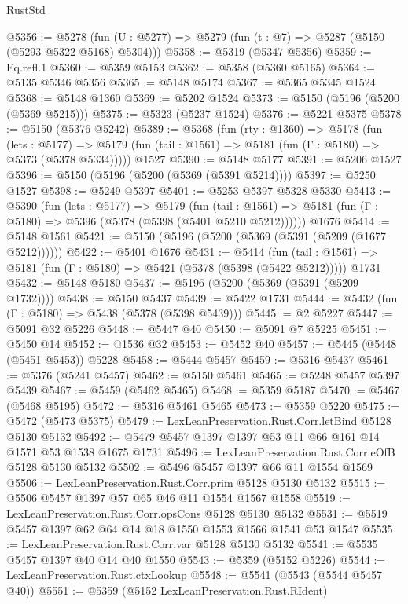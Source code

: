 \begin{lexlean}{RustStd}
\begin{coremodule}
@5356 := @5278 (fun (U : @5277) => @5279 (fun (t : @7) => @5287 (@5150 (@5293 @5322 @5168) @5304)))
@5358 := @5319 (@5347 @5356)
@5359 := Eq.refl.{1}
@5360 := @5359 @5153
@5362 := @5358 (@5360 @5165)
@5364 := @5135 @5346 @5356
@5365 := @5148 @5174
@5367 := @5365 @5345 @1524
@5368 := @5148 @1360
@5369 := @5202 @1524
@5373 := @5150 (@5196 (@5200 (@5369 @5215)))
@5375 := @5323 (@5237 @1524)
@5376 := @5221 @5375
@5378 := @5150 (@5376 @5242)
@5389 := @5368
    (fun (rty : @1360) =>
    @5178
      (fun (lets : @5177) =>
      @5179 (fun (tail : @1561) => @5181 (fun (Γ : @5180) => @5373 (@5378 @5334)))))
    @1527
@5390 := @5148 @5177
@5391 := @5206 @1527
@5396 := @5150 (@5196 (@5200 (@5369 (@5391 @5214))))
@5397 := @5250 @1527
@5398 := @5249 @5397
@5401 := @5253 @5397 @5328 @5330
@5413 := @5390
    (fun (lets : @5177) =>
    @5179
      (fun (tail : @1561) => @5181 (fun (Γ : @5180) => @5396 (@5378 (@5398 (@5401 @5210 @5212))))))
    @1676
@5414 := @5148 @1561
@5421 := @5150 (@5196 (@5200 (@5369 (@5391 (@5209 (@1677 @5212))))))
@5422 := @5401 @1676
@5431 := @5414
    (fun (tail : @1561) => @5181 (fun (Γ : @5180) => @5421 (@5378 (@5398 (@5422 @5212)))))
    @1731
@5432 := @5148 @5180
@5437 := @5196 (@5200 (@5369 (@5391 (@5209 @1732))))
@5438 := @5150 @5437
@5439 := @5422 @1731
@5444 := @5432 (fun (Γ : @5180) => @5438 (@5378 (@5398 @5439)))
@5445 := @2 @5227
@5447 := @5091 @32 @5226
@5448 := @5447 @40
@5450 := @5091 @7 @5225
@5451 := @5450 @14
@5452 := @1536 @32
@5453 := @5452 @40
@5457 := @5445 (@5448 (@5451 @5453)) @5228
@5458 := @5444 @5457
@5459 := @5316 @5437
@5461 := @5376 (@5241 @5457)
@5462 := @5150 @5461
@5465 := @5248 @5457 @5397 @5439
@5467 := @5459 (@5462 @5465)
@5468 := @5359 @5187
@5470 := @5467 (@5468 @5195)
@5472 := @5316 @5461 @5465
@5473 := @5359 @5220
@5475 := @5472 (@5473 @5375)
@5479 := LexLeanPreservation.Rust.Corr.letBind @5128 @5130 @5132
@5492 := @5479 @5457 @1397 @1397 @53 @11 @66 @161 @14 @1571 @53 @1538 @1675 @1731
@5496 := LexLeanPreservation.Rust.Corr.eOfB @5128 @5130 @5132
@5502 := @5496 @5457 @1397 @66 @11 @1554 @1569
@5506 := LexLeanPreservation.Rust.Corr.prim @5128 @5130 @5132
@5515 := @5506 @5457 @1397 @57 @65 @46 @11 @1554 @1567 @1558
@5519 := LexLeanPreservation.Rust.Corr.opsCons @5128 @5130 @5132
@5531 := @5519 @5457 @1397 @62 @64 @14 @18 @1550 @1553 @1566 @1541 @53 @1547
@5535 := LexLeanPreservation.Rust.Corr.var @5128 @5130 @5132
@5541 := @5535 @5457 @1397 @40 @14 @40 @1550
@5543 := @5359 (@5152 @5226)
@5544 := LexLeanPreservation.Rust.ctxLookup
@5548 := @5541 (@5543 (@5544 @5457 @40))
@5551 := @5359 (@5152 LexLeanPreservation.Rust.RIdent)

\end{coremodule}
\end{lexlean}
